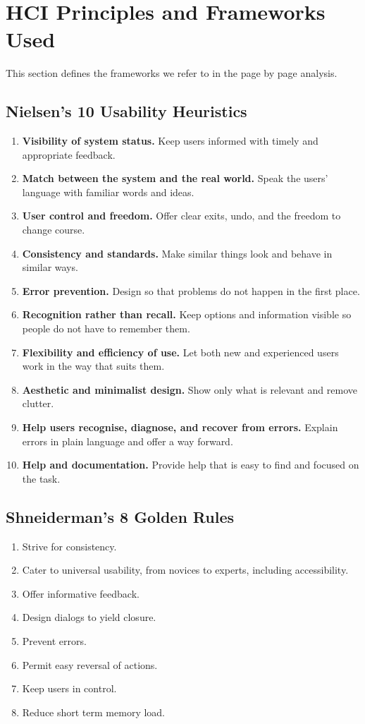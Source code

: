\documentclass[12pt,a4paper]{article}
\begin{document}
\section{HCI Principles and Frameworks Used}
This section defines the frameworks we refer to in the page by page analysis.

\subsection{Nielsen's 10 Usability Heuristics}
\begin{enumerate}[label=N\arabic*.]
  \item \textbf{Visibility of system status.} Keep users informed with timely and
        appropriate feedback.
  \item \textbf{Match between the system and the real world.} Speak the users'
        language with familiar words and ideas.
  \item \textbf{User control and freedom.} Offer clear exits, undo, and the
        freedom to change course.
  \item \textbf{Consistency and standards.} Make similar things look and behave
        in similar ways.
  \item \textbf{Error prevention.} Design so that problems do not happen in the
        first place.
  \item \textbf{Recognition rather than recall.} Keep options and information
        visible so people do not have to remember them.
  \item \textbf{Flexibility and efficiency of use.} Let both new and experienced
        users work in the way that suits them.
  \item \textbf{Aesthetic and minimalist design.} Show only what is relevant and
        remove clutter.
  \item \textbf{Help users recognise, diagnose, and recover from errors.} Explain
        errors in plain language and offer a way forward.
  \item \textbf{Help and documentation.} Provide help that is easy to find and
        focused on the task.
\end{enumerate}

\subsection{Shneiderman's 8 Golden Rules}
\begin{enumerate}[label=S\arabic*.]
  \item Strive for consistency.
  \item Cater to universal usability, from novices to experts, including
        accessibility.
  \item Offer informative feedback.
  \item Design dialogs to yield closure.
  \item Prevent errors.
  \item Permit easy reversal of actions.
  \item Keep users in control.
  \item Reduce short term memory load.
\end{enumerate}
\end{document}

